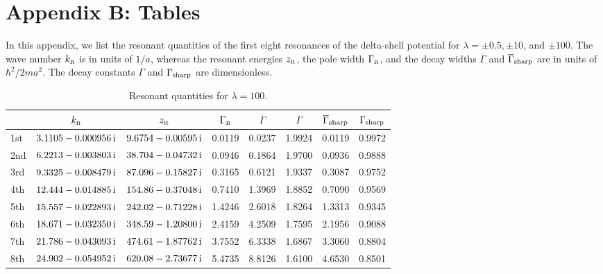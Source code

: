 \documentclass[12pt]{article}
\newcommand{\rmi}{{\rm i}}
\newcommand{\zr}{z_{\text{\tiny R}}}
\newcommand{\gr}{\Gamma _{\text{\tiny R}}}
\newcommand{\kr}{k_{\text{\tiny R}}}
\begin{document}
\section{Appendix B: Tables}
\setcounter{equation}{0}
\label{app:tables}



In this appendix, we list the resonant quantities of the first
eight resonances of the delta-shell potential for 
$\lambda = \pm 0.5, \pm 10$, and $\pm 100$. The wave number
$\kr$ is in units of $1/a$, whereas the resonant energies
$\zr$, the pole width $\gr$, and the decay widths 
$\overline{\Gamma}$ and $\overline{\Gamma}_{\rm sharp}$ are in
units of $\hbar ^2/2ma^2$. The decay constants
$\Gamma$ and $\Gamma_{\rm sharp}$ are dimensionless.


\vskip-0.3cm


\begin{table}[H]
\centering
\vspace{6pt}
\begin{tabular}{|l| c| c| c| c | c | c | c|} %
\hline\hline
      & $\kr$ & $\zr$ & $\gr$ & $\overline{\Gamma}$ & $\Gamma$ & 
$\overline{\Gamma}_{\rm sharp}$
& $\Gamma_{\rm sharp}$  \\

\hline

1st & $3.1105 -0.000956 \, \rmi$ & $9.6754 -0.00595 \, \rmi$ & 
0.0119 & 0.0237 & 1.9924 & 0.0119 & 0.9972    \\

2nd & $6.2213 -0.003803 \, \rmi$ & $38.704 -0.04732 \, \rmi$ & 
0.0946 & 0.1864 & 1.9700 & 0.0936 & 0.9888  \\

3rd & $9.3325  -0.008479 \, \rmi$ & $87.096 -0.15827 \, \rmi$ & 
0.3165 & 0.6121 & 1.9337 & 0.3087 & 0.9752  \\

4th & $12.444 - 0.014885 \, \rmi$ & $154.86 -0.37048 \, \rmi$ & 
0.7410 & 1.3969 & 1.8852 & 0.7090 & 0.9569  \\

5th & $15.557 -0.022893 \, \rmi$ & $242.02 -0.71228 \, \rmi$ & 
1.4246 & 2.6018 & 1.8264 & 1.3313 & 0.9345 \\

6th & $18.671 -0.032350 \, \rmi$ & $348.59 -1.20800 \, \rmi$ & 
2.4159 & 4.2509 & 1.7595 & 2.1956 & 0.9088  \\

7th & $21.786 -0.043093 \, \rmi$ & $474.61 -1.87762 \, \rmi$ & 
3.7552 & 6.3338 & 1.6867 & 3.3060 & 0.8804  \\

8th & $24.902 -0.054952 \, \rmi$ & $620.08 -2.73677 \, \rmi$ & 
5.4735 & 8.8126 & 1.6100 & 4.6530 & 0.8501  \\



\hline\hline 
\end{tabular}
\caption{Resonant quantities for $\lambda =100$. }
\label{table:100}
\end{table}
\end{document}

